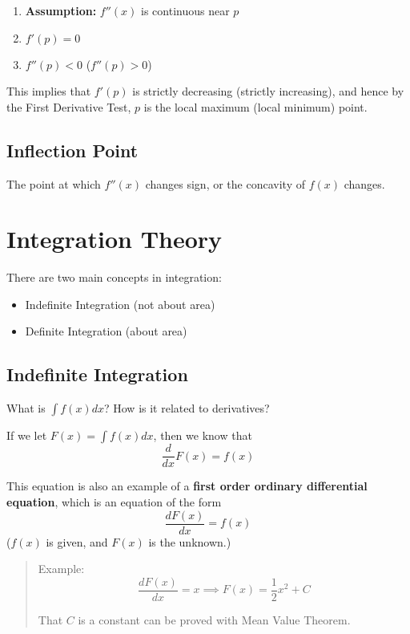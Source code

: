 \begin{enumerate}
  \item \textbf{Assumption:} $f''(x)$ is continuous near $p$
  \item $f'(p) = 0$
  \item $f''(p) < 0$ ($f''(p) > 0$)
\end{enumerate}

This implies that $f'(p)$ is strictly decreasing (strictly increasing), and hence by the First Derivative Test, $p$ is the local maximum (local minimum) point.

\subsection{Inflection Point}

The point at which $f''(x)$ changes sign, or the concavity of $f(x)$ changes.

\section{Integration Theory}

There are two main concepts in integration:

\begin{itemize}
  \item Indefinite Integration (not about area)
  \item Definite Integration (about area)
\end{itemize}

\subsection{Indefinite Integration}

What is $\int f(x) dx$? How is it related to derivatives?

If we let $F(x) = \int f(x) dx$, then we know that $$\frac{d}{dx} F(x) = f(x)$$

This equation is also an example of a \textbf{first order ordinary differential equation}, which is an equation of the form $$ \frac{dF(x)}{dx} = f(x) $$ ($f(x)$ is given, and $F(x)$ is the unknown.)

\begin{quote}
  Example: $$ \frac{dF(x)}{dx} = x \implies F(x) = \frac{1}{2}x^2 + C $$
  
  That $C$ is a constant can be proved with Mean Value Theorem.
\end{quote}